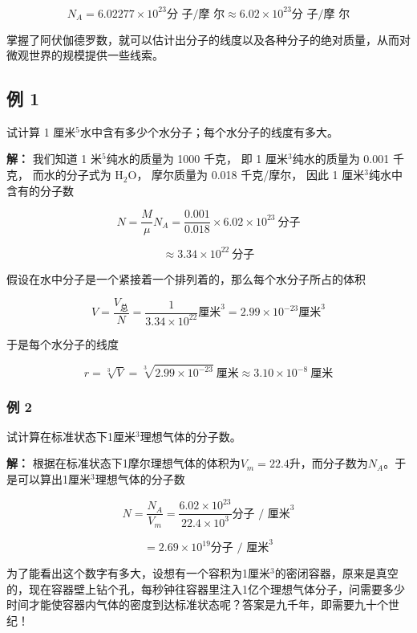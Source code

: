 \[
N _ {A} = 6.02277 \times 10 ^ {23} \text{分   子} / \text{摩   尔} \approx 6.02 \times 10 ^ {23} \text{分   子} / \text{摩   尔}
\]

掌握了阿伏伽德罗数，就可以估计出分子的线度以及各种分子的绝对质量，从而对微观世界的规模提供一些线索。

\subsection{例 1}\label{ux4f8b-1-5}

试计算 1 厘米\(^{5}\)水中含有多少个水分子；每个水分子的线度有多大。

\textbf{解：} 我们知道 1 米\(^{5}\)纯水的质量为 1000 千克， 即 1
厘米\(^{3}\)纯水的质量为 0.001 千克， 而水的分子式为 H\(_{2}\)O，
摩尔质量为 0.018 千克/摩尔， 因此 1 厘米\(^{3}\)纯水中含有的分子数

\[
N=\frac{M}{\mu}N_A=\frac{0.001}{0.018}\times6.02\times10^{23}\ \text{分子}
\]

\[
\approx3.34\times10^{22}\ \text{分子}
\]

假设在水中分子是一个紧接着一个排列着的，那么每个水分子所占的体积

\[
V = \frac {V _ {\text{总}}}{N} = \frac {1}{3.34 \times 10 ^ {22}} \text{厘米} ^ {3} = 2.99 \times 10 ^ {- 23} \text{厘米} ^ {3}
\]

于是每个水分子的线度

\[
r=\sqrt[3]{V}=\sqrt[3]{2.99\times10^{-23}}\ \text{厘米}\approx3.10\times10^{-8}\ \text{厘米}
\]

\subsubsection{例 2}\label{ux4f8b-2-5}

试计算在标准状态下1厘米\(^{3}\)理想气体的分子数。

\textbf{解：}
根据在标准状态下1摩尔理想气体的体积为\(V_{m}=22.4\)升，而分子数为\(N_{A}\)。于是可以算出1厘米\(^{3}\)理想气体的分子数

\[
N = \frac {N _ {A}}{V _ {m}} = \frac {6.02 \times 10 ^ {23}}{22.4 \times 10 ^ {3}} \text{分子 / 厘米} ^ {3}
\]

\[
= 2.69 \times 10 ^ {19} \text{分子 / 厘米} ^ {3}
\]

为了能看出这个数字有多大，设想有一个容积为1厘米\(^{3}\)的密闭容器，原来是真空的，现在容器壁上钻个孔，每秒钟往容器里注入1亿个理想气体分子，问需要多少时间才能使容器内气体的密度到达标准状态呢？答案是九千年，即需要九十个世纪！

